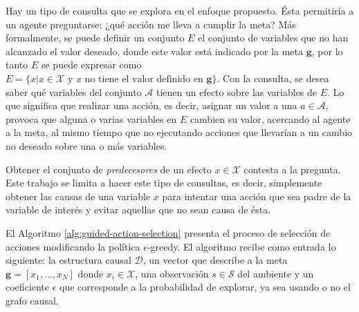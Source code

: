 
Hay un tipo de consulta que se explora en el enfoque propuesto. Ésta 
permitiría a un agente preguntarse: ¿qué acción me lleva a cumplir la meta?
Más formalmente, se puede definir un conjunto $E$
el conjunto de variables que no han alcanzado el
valor deseado, donde este valor está indicado por la meta $\mathbf{g}$, por 
lo tanto $E$ se puede expresar como $E = \{x | x \in \mathcal{X} \text{ y } x \text{ no tiene el valor definido en } \mathbf{g}\}$.
Con la consulta, se desea saber qué variables del conjunto 
$\mathcal{A}$ tienen un efecto sobre
las variables de $E$. Lo que significa que realizar una acción, es decir, asignar un valor a 
una $a \in \mathcal{A}$, provoca que alguna o varias variables en $E$ cambien su valor, acercando 
al agente a la meta, al mismo tiempo que no ejecutando acciones que llevarían a un cambio no deseado
sobre una o más variables.

Obtener el conjunto de \textit{predecesores} de un efecto $x \in \mathcal{X}$ contesta
a la pregunta. Este trabajo se limita a hacer este tipo de consultas,
es decir, simplemente obtener las causas de una variable $x$ para intentar una acción que
sea padre de la variable de interés y evitar aquellas que no sean causa de ésta.

El Algoritmo \ref{alg:guided-action-selection} presenta el proceso 
de selección de acciones modificando la política
$\epsilon$-greedy.
El algoritmo recibe como entrada lo siguiente: la estructura causal $\mathcal{D}$, un vector que describe a la meta $\mathbf{g} = [x_1, \dots, x_N]$ donde $x_i \in \mathcal{X}$, una observación $s \in \mathcal{S}$ del ambiente y un coeficiente $\epsilon$ que corresponde a la probabilidad de explorar, ya sea usando o no el grafo causal. 

